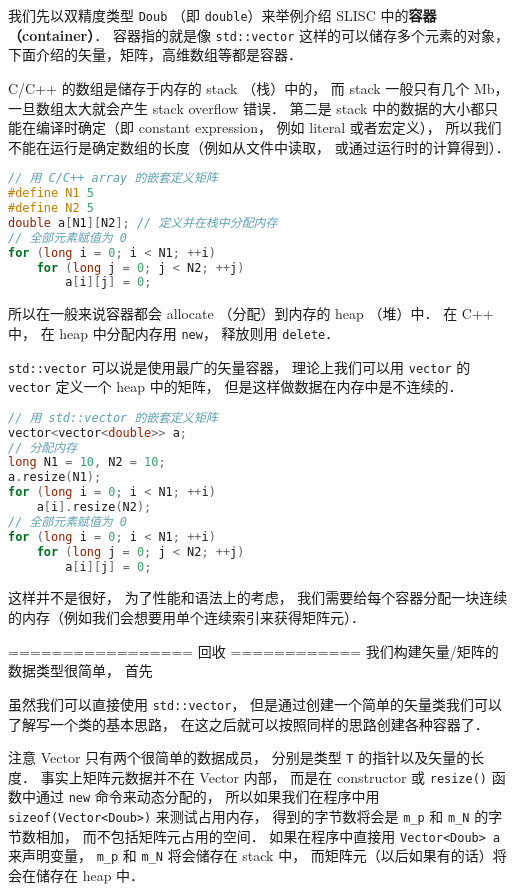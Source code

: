 
\begin{issues}
\issueDraft
\end{issues}


我们先以双精度类型 \verb|Doub| （即 \verb|double|）来举例介绍 SLISC 中的\textbf{容器（container）}． 容器指的就是像 \verb|std::vector| 这样的可以储存多个元素的对象， 下面介绍的矢量，矩阵，高维数组等都是容器．

C/C++ 的数组是储存于内存的 stack （栈）中的， 而 stack 一般只有几个 Mb， 一旦数组太大就会产生 stack overflow 错误． 第二是 stack 中的数据的大小都只能在编译时确定（即 constant expression， 例如 literal 或者宏定义）， 所以我们不能在运行是确定数组的长度（例如从文件中读取， 或通过运行时的计算得到）．
\begin{lstlisting}[language=cpp]
// 用 C/C++ array 的嵌套定义矩阵
#define N1 5
#define N2 5
double a[N1][N2]; // 定义并在栈中分配内存
// 全部元素赋值为 0
for (long i = 0; i < N1; ++i)
    for (long j = 0; j < N2; ++j)
        a[i][j] = 0;
\end{lstlisting}

所以在一般来说容器都会 allocate （分配）到内存的 heap （堆）中． 在 C++ 中， 在 heap 中分配内存用 \verb|new|， 释放则用 \verb|delete|．

\verb|std::vector| 可以说是使用最广的矢量容器， 理论上我们可以用 \verb|vector| 的 \verb|vector| 定义一个 heap 中的矩阵， 但是这样做数据在内存中是不连续的．
\begin{lstlisting}[language=cpp]
// 用 std::vector 的嵌套定义矩阵
vector<vector<double>> a;
// 分配内存
long N1 = 10, N2 = 10;
a.resize(N1);
for (long i = 0; i < N1; ++i)
    a[i].resize(N2);
// 全部元素赋值为 0
for (long i = 0; i < N1; ++i)
    for (long j = 0; j < N2; ++j)
        a[i][j] = 0;
\end{lstlisting}
这样并不是很好， 为了性能和语法上的考虑， 我们需要给每个容器分配一块连续的内存（例如我们会想要用单个连续索引来获得矩阵元）．

================= 回收 ============
我们构建矢量/矩阵的数据类型很简单， 首先

虽然我们可以直接使用 \verb|std::vector|， 但是通过创建一个简单的矢量类我们可以了解写一个类的基本思路， 在这之后就可以按照同样的思路创建各种容器了．

注意 Vector 只有两个很简单的数据成员， 分别是类型 \verb|T| 的指针以及矢量的长度． 事实上矩阵元数据并不在 Vector 内部， 而是在 constructor 或 \verb|resize()| 函数中通过 \verb|new| 命令来动态分配的， 所以如果我们在程序中用 \verb|sizeof(Vector<Doub>)| 来测试占用内存， 得到的字节数将会是 \verb|m_p| 和 \verb|m_N| 的字节数相加， 而不包括矩阵元占用的空间． 如果在程序中直接用 \verb|Vector<Doub> a| 来声明变量， \verb|m_p| 和 \verb|m_N| 将会储存在 stack 中， 而矩阵元（以后如果有的话）将会在储存在 heap 中．

